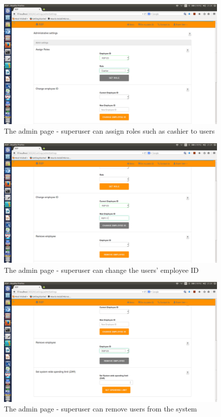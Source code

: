 \documentclass[a4paper,12pt]{article}
\begin{document}
\begin{figure}[H]
  \centering
    \includegraphics[width=1.0\textwidth]{screenshots/assignRole.png}
    \caption{The admin page - superuser can assign roles such as cashier to users} 
\end{figure}

\begin{figure}[H]
  \centering
    \includegraphics[width=1.0\textwidth]{screenshots/changeEmplid.png}
    \caption{The admin page - superuser can change the users' employee ID} 
\end{figure}

\begin{figure}[H]
  \centering
    \includegraphics[width=1.0\textwidth]{screenshots/removeUser.png}
    \caption{The admin page - superuser can remove users from the system} 
\end{figure}
\end{document}
